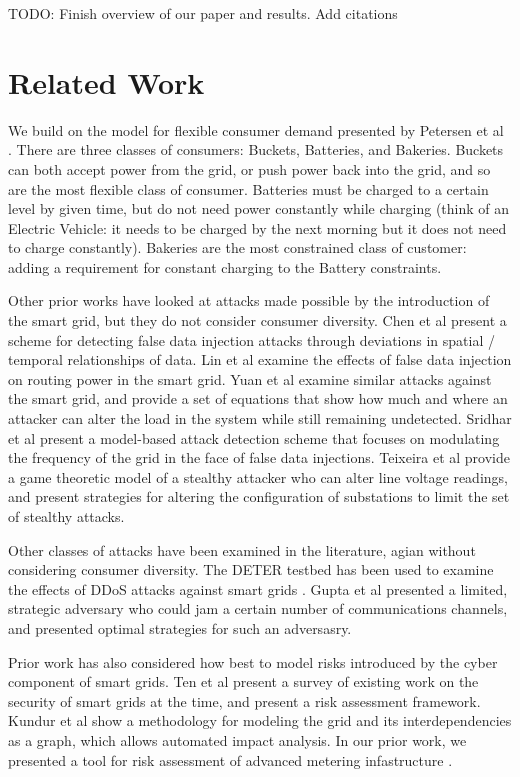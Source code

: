 \documentclass[conference]{IEEEtran}
\begin{document}
TODO: Finish overview of our paper and results. Add citations

\section{Related Work}
\label{Related Work}

We build on the model for flexible consumer demand presented by Petersen et al \cite{petersen2013taxonomy}. There are three classes of consumers: Buckets, Batteries, and Bakeries. Buckets can both accept power from the grid, or push power back into the grid, and so are the most flexible class of consumer. Batteries must be charged to a certain level by given time, but do not need power constantly while charging (think of an Electric Vehicle: it needs to be charged by the next morning but it does not need to charge constantly). Bakeries are the most constrained class of customer: adding a requirement for constant charging to the Battery constraints.

Other prior works have looked at attacks made possible by the introduction of the smart grid, but they do not consider consumer diversity. Chen et al \cite{chen2015detection} present a scheme for detecting false data injection attacks through deviations in spatial / temporal relationships of data. Lin et al \cite{lin2012false} examine the effects of false data injection on routing power in the smart grid. Yuan et al \cite{yuan2011modeling} examine similar attacks against the smart grid, and provide a set of equations that show how much and where an attacker can alter the load in the system while still remaining undetected. Sridhar et al \cite{sridhar2014model} present a model-based attack detection scheme that focuses on modulating the frequency of the grid in the face of false data injections. Teixeira et al \cite{teixeira2014security} provide a game theoretic model of a stealthy attacker who can alter line voltage readings, and present strategies for altering the configuration of substations to limit the set of stealthy attacks. 

Other classes of attacks have been examined in the literature, agian without considering consumer diversity. The DETER testbed has been used to examine the effects of DDoS attacks against smart grids \cite{hussain2012ncs}. Gupta et al \cite{gupta2010optimal} presented a limited, strategic adversary who could jam a certain number of communications channels, and presented optimal strategies for such an adversasry. 

Prior work has also considered how best to model risks introduced by the cyber component of smart grids. Ten et al \cite{ten2010cybersecurity} present a survey of existing work on the security of smart grids at the time, and present a risk assessment framework. Kundur et al \cite{kundur2010towards} show a methodology for modeling the grid and its interdependencies as a graph, which allows automated impact analysis. In our prior work, we presented a tool for risk assessment of advanced metering infastructure \cite{shawly2014risk}.
\end{document}
